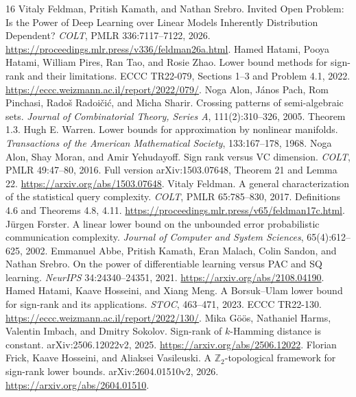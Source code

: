 \documentclass[11pt]{article}
\newcommand{\1}{\mathbf 1}
\begin{document}
\begin{thebibliography}{16}
 Vitaly Feldman, Pritish Kamath, and Nathan Srebro. Invited Open Problem: Is the Power of Deep Learning over Linear Models Inherently Distribution Dependent? \emph{COLT}, PMLR 336:7117--7122, 2026. \url{https://proceedings.mlr.press/v336/feldman26a.html}.
 Hamed Hatami, Pooya Hatami, William Pires, Ran Tao, and Rosie Zhao. Lower bound methods for sign-rank and their limitations. ECCC TR22-079, Sections 1--3 and Problem 4.1, 2022. \url{https://eccc.weizmann.ac.il/report/2022/079/}.
 Noga Alon, J\'anos Pach, Rom Pinchasi, Rado\v{s} Radoi\v{c}i\'c, and Micha Sharir. Crossing patterns of semi-algebraic sets. \emph{Journal of Combinatorial Theory, Series A}, 111(2):310--326, 2005. Theorem 1.3.
 Hugh E. Warren. Lower bounds for approximation by nonlinear manifolds. \emph{Transactions of the American Mathematical Society}, 133:167--178, 1968.
 Noga Alon, Shay Moran, and Amir Yehudayoff. Sign rank versus VC dimension. \emph{COLT}, PMLR 49:47--80, 2016. Full version arXiv:1503.07648, Theorem 21 and Lemma 22. \url{https://arxiv.org/abs/1503.07648}.
 Vitaly Feldman. A general characterization of the statistical query complexity. \emph{COLT}, PMLR 65:785--830, 2017. Definitions 4.6 and Theorems 4.8, 4.11. \url{https://proceedings.mlr.press/v65/feldman17c.html}.
 J\"urgen Forster. A linear lower bound on the unbounded error probabilistic communication complexity. \emph{Journal of Computer and System Sciences}, 65(4):612--625, 2002.
 Emmanuel Abbe, Pritish Kamath, Eran Malach, Colin Sandon, and Nathan Srebro. On the power of differentiable learning versus PAC and SQ learning. \emph{NeurIPS} 34:24340--24351, 2021. \url{https://arxiv.org/abs/2108.04190}.
 Hamed Hatami, Kaave Hosseini, and Xiang Meng. A Borsuk--Ulam lower bound for sign-rank and its applications. \emph{STOC}, 463--471, 2023. ECCC TR22-130. \url{https://eccc.weizmann.ac.il/report/2022/130/}.
 Mika G\"o\"os, Nathaniel Harms, Valentin Imbach, and Dmitry Sokolov. Sign-rank of $k$-Hamming distance is constant. arXiv:2506.12022v2, 2025. \url{https://arxiv.org/abs/2506.12022}.
 Florian Frick, Kaave Hosseini, and Aliaksei Vasileuski. A $\mathbb Z_2$-topological framework for sign-rank lower bounds. arXiv:2604.01510v2, 2026. \url{https://arxiv.org/abs/2604.01510}.


\end{thebibliography}
\end{document}
